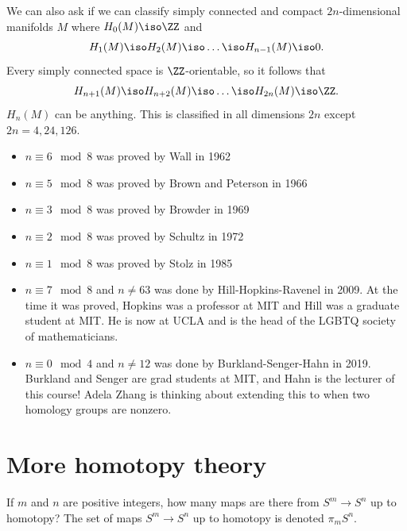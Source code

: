 \documentclass{standalone}
\begin{document}
We can also ask if we can classify simply connected and compact
\(2n\)-dimensional manifolds \(M\) where \(H_0(M) \iso \ZZ\) and
\[
  H_1(M) \iso H_2(M) \iso \dots \iso H_{n - 1}(M) \iso 0.
\]
Every simply connected space is \(\ZZ\)-orientable, so it follows that
\[
  H_{n+1}(M) \iso H_{n+2}(M) \iso \dots \iso H_{2n}(M) \iso \ZZ.
\]
\(H_n(M)\) can be anything.
This is classified in all dimensions \(2n\) except \(2n = 4, 24, 126\).

\begin{itemize}
  \item \(n \equiv 6 \mod 8\) was proved by Wall in 1962
  \item \(n \equiv 5 \mod 8\) was proved by Brown and Peterson in 1966
  \item \(n \equiv 3 \mod 8\) was proved by Browder in 1969
  \item \(n \equiv 2 \mod 8\) was proved by Schultz in 1972
  \item \(n \equiv 1 \mod 8\) was proved by Stolz in 1985
  \item \(n \equiv 7 \mod 8\) and \(n \neq 63\) was done by
        Hill-Hopkins-Ravenel in 2009.
        At the time it was proved, Hopkins was a professor at MIT and
        Hill was a graduate student at MIT. %
        He is now at UCLA and is the head of
        the LGBTQ society of mathematicians.
  \item \(n \equiv 0 \mod 4\) and \(n \neq 12\) was done by
        Burkland-Senger-Hahn in 2019. Burkland and Senger are
        grad students at MIT, and Hahn is the lecturer of this course!
        Adela Zhang is thinking about extending this to when
        two homology groups are nonzero.
\end{itemize}


\section{More homotopy theory}
\begin{question}
  If \(m\) and \(n\) are positive integers,
  how many maps are there from \(S^m \to S^n\) up to homotopy?
  The set of maps \(S^m \to S^n\) up to homotopy is denoted \(\pi_m S^n\).
\end{question}
\end{document}
